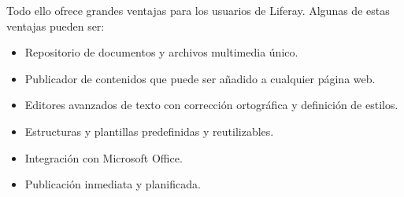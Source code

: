 \par Todo ello ofrece grandes ventajas para los usuarios de Liferay. Algunas de estas ventajas pueden ser:
\begin{itemize}
    \item Repositorio de documentos y archivos multimedia único.
    \item Publicador de contenidos que puede ser añadido a cualquier página web.
    \item Editores avanzados de texto con corrección ortográfica y definición de estilos.
    \item Estructuras y plantillas predefinidas y reutilizables.
    \item Integración con Microsoft Office.
    \item Publicación inmediata y planificada.
\end{itemize}
